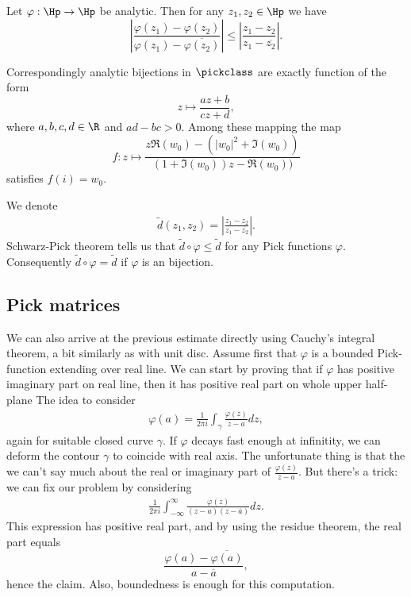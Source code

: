 \begin{lause}
	Let $\varphi : \Hp \to \Hp$ be analytic. Then for any $z_{1}, z_{2} \in \Hp$ we have
	\[
		\left|\frac{\varphi(z_{1}) - \varphi(z_{2})}{\varphi(z_{1}) - \overline{\varphi(z_{2})}} \right| \leq \left|\frac{z_{1} - z_{2}}{z_{1} - \overline{z_{2}}} \right|.
	\]
\end{lause}

Correspondingly analytic bijections in $\pickclass$ are exactly function of the form
\[
	z \mapsto \frac{a z + b}{c z + d},
\]
where $a, b, c, d \in \R$ and $a d - b c > 0$. Among these mapping the map
\[
	f : z \mapsto \frac{z \Re(w_{0}) - (|w_{0}|^2 + \Im(w_{0}))}{(1 + \Im(w_{0})) z - \Re(w_{0}))}
\]
satisfies $f(i) = w_{0}$.

We denote
\begin{align*}
	\tilde{d}(z_{1}, z_{2}) = \left|\frac{z_{1} - z_{2}}{z_{1} - \overline{z_{2}}} \right|.
\end{align*}
Schwarz-Pick theorem tells us that $\tilde{d} \circ \varphi \leq \tilde{d}$ for any Pick functions $\varphi$. Consequently $\tilde{d} \circ \varphi = \tilde{d}$ if $\varphi$ is an bijection.

\subsection{Pick matrices}

We can also arrive at the previous estimate directly using Cauchy's integral theorem, a bit similarly as with unit disc. Assume first that $\varphi$ is a bounded Pick-function extending over real line. We can start by proving that if $\varphi$ has positive imaginary part on real line, then it has positive real part on whole upper half-plane The idea to consider
\begin{align*}
	\varphi(a) = \frac{1}{2 \pi i}\int_{\gamma} \frac{\varphi(z)}{z - a} dz,
\end{align*}
again for suitable closed curve $\gamma$. If $\varphi$ decays fast enough at infinitity, we can deform the contour $\gamma$ to coincide with real axis. The unfortunate thing is that the we can't say much about the real or imaginary part of $ \frac{\varphi(z)}{z - a}$. But there's a trick: we can fix our problem by considering
\begin{align*}
	\frac{1}{2 \pi i}\int_{-\infty}^{\infty} \frac{\varphi(z)}{(z - a) (z - \overline{a})} dz.
\end{align*}
This expression has positive real part, and by using the residue theorem, the real part equals
\[
	\frac{\varphi(a) - \overline{\varphi(a)}}{a - \overline{a}},
\]
hence the claim. Also, boundedness is enough for this computation.


